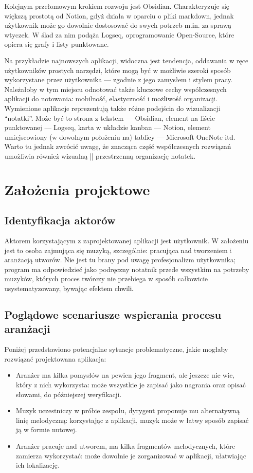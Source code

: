 \documentclass[12pt]{article}
\begin{document}
\begin{itemize}
	      Kolejnym przełomowym krokiem rozwoju jest Obsidian. Charakteryzuje się większą prostotą od Notion,
	      gdyż działa w oparciu o pliki markdown, jednak użytkownik może go dowolnie dostosować do swych potrzeb m.in.
	      za sprawą
	      wtyczek. W ślad za nim podąża Logseq, oprogramowanie Open-Source, które opiera się grafy i listy punktowane.
\end{itemize}
Na przykładzie najnowszych aplikacji, widoczna jest tendencja, oddawania w ręce użytkowników prostych narzędzi,
które mogą być w możliwie szeroki sposób wykorzystane przez użytkownika — zgodnie z jego zamysłem i stylem pracy.
Należałoby w tym miejscu odnotować także kluczowe cechy współczesnych aplikacji do notowania: mobilność, elastyczność
i możliwość organizacji.
Wymienione aplikacje reprezentują także różne podejścia do wizualizacji \enquote{notatki}.
Może być to strona z tekstem — Obsidian, element na liście punktowanej — Logseq, karta w układzie kanban — Notion,
element umiejscowiony (w dowolnym położeniu na) tablicy — Microsoft OneNote itd. Warto tu jednak zwrócić uwagę,
że znacząca część współczesnych rozwiązań umożliwia również wizualną || przestrzenną organizację notatek.

\newpage
\section{Założenia projektowe}
\subsection{Identyfikacja aktorów}
Aktorem korzystającym z zaprojektowanej aplikacji jest użytkownik.
W założeniu jest to osoba zajmująca się muzyką, szczególnie: pracująca nad tworzeniem i aranżacją utworów.
Nie jest tu brany pod uwagę profesjonalizm użytkownika; program ma odpowiedzieć jako podręczny notatnik przede wszystkim
na potrzeby muzyków, których proces twórczy nie przebiega w sposób całkowicie usystematyzowany, bywając efektem chwili.

\subsection{Poglądowe scenariusze wspierania procesu aranżacji}
Poniżej przedstawiono potencjalne sytuacje problematyczne, jakie mogłaby rozwiązać projektowana aplikacja:
\begin{itemize}
	\item Aranżer ma kilka pomysłów na pewien jego fragment, ale jeszcze nie wie, który z nich wykorzysta:
	      może wszystkie je zapisać jako nagrania oraz opisać słowami, do późniejszej weryfikacji.
	\item Muzyk uczestniczy w próbie zespołu, dyrygent proponuje mu alternatywną linię melodyczną:
	      korzystając z aplikacji, muzyk może w łatwy sposób zapisać ją w formie nutowej.
	\item Aranżer pracuje nad utworem, ma kilka fragmentów melodycznych, które zamierza wykorzystać:
	      może dowolnie je zorganizować w aplikacji, ułatwiając ich lokalizację.
\end{itemize}
\end{document}
